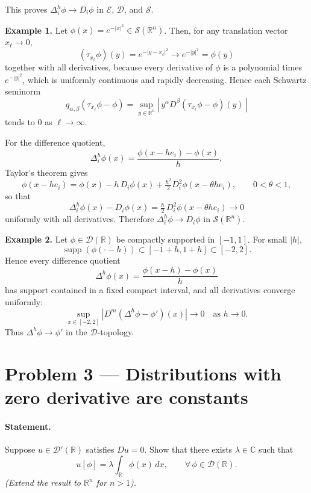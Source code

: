 \documentclass[12pt,a4paper]{article}
\theoremstyle{plain}
\theoremstyle{definition}
\theoremstyle{remark}
\theoremstyle{remark}
\begin{document}
\bigskip

This proves $\Delta_i^{h}\phi\to D_i\phi$ in $\mathcal E$, $\mathcal D$, and $\mathcal S$.


\bigskip

\textbf{Example 1.}
Let $\phi(x)=e^{-|x|^2}\in\mathcal S(\mathbb R^n)$. Then, for any translation vector $x_\ell\to0$,
\[
(\tau_{x_\ell}\phi)(y)=e^{-|y-x_\ell|^2}
\longrightarrow e^{-|y|^2}=\phi(y)
\]
together with all derivatives, because every derivative of $\phi$ is a polynomial times $e^{-|y|^2}$,
which is uniformly continuous and rapidly decreasing. Hence each Schwartz seminorm
\[
q_{\alpha,\beta}(\tau_{x_\ell}\phi-\phi)
=\sup_{y\in\mathbb R^n}|\,y^\alpha D^\beta(\tau_{x_\ell}\phi-\phi)(y)\,|
\]
tends to $0$ as $\ell\to\infty$.

\medskip

For the difference quotient,
\[
\Delta_i^{h}\phi(x)=\frac{\phi(x-h e_i)-\phi(x)}{h},
\]
Taylor's theorem gives
\[
\phi(x-h e_i)=\phi(x)-h\,D_i\phi(x)+\tfrac{h^2}{2}D_i^2\phi(x-\theta h e_i),
\qquad 0<\theta<1,
\]
so that
\[
\Delta_i^{h}\phi(x)-D_i\phi(x)
=\tfrac{h}{2}\,D_i^2\phi(x-\theta h e_i)\to0
\]
uniformly with all derivatives. Therefore $\Delta_i^{h}\phi\to D_i\phi$ in $\mathcal S(\mathbb R^n)$.

\bigskip
\bigskip

\textbf{Example 2.}
Let $\phi\in\mathcal D(\mathbb R)$ be compactly supported in $[-1,1]$. For small $|h|$,
\[
\operatorname{supp}(\phi(\cdot-h))\subset[-1+h,1+h]\subset[-2,2].
\]
Hence every difference quotient
\[
\Delta^{h}\phi(x)=\frac{\phi(x-h)-\phi(x)}{h}
\]
has support contained in a fixed compact interval, and all derivatives converge uniformly:
\[
\sup_{x\in[-2,2]}|D^m(\Delta^{h}\phi-\phi')(x)|\longrightarrow0
\quad\text{as }h\to0.
\]
Thus $\Delta^{h}\phi\to\phi'$ in the $\mathcal D$-topology.

\bigskip


\section*{Problem 3 — Distributions with zero derivative are constants}

\paragraph{Statement.}
Suppose \(u\in\mathcal D'(\mathbb R)\) satisfies \(Du=0\). Show that there exists \(\lambda\in\mathbb C\) such that
\[
u[\phi]=\lambda\int_{\mathbb R}\phi(x)\,dx,\qquad\forall\,\phi\in\mathcal D(\mathbb R).
\]
\emph{(Extend the result to \(\mathbb R^n\) for \(n>1\)).}
\end{document}
